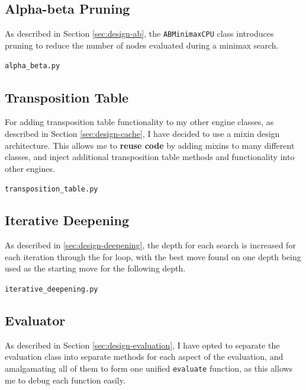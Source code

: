 \documentclass[../main/main.tex]{subfiles}
\begin{document}
\subsection{Alpha-beta Pruning}
\label{sec:alpha-beta}
As described in Section \ref{sec:design-ab}, the \lstinline{ABMinimaxCPU} class introduces pruning to reduce the number of nodes evaluated during a minimax search.

\noindent\verb|alpha_beta.py|


\subsection{Transposition Table}
\label{sec:transposition-table}
For adding transposition table functionality to my other engine classes, as described in Section \ref{sec:design-cache}, I have decided to use a mixin design architecture. This allows me to \textbf{reuse code} by adding mixins to many different classes, and inject additional transposition table methods and functionality into other engines.

\noindent\verb|transposition_table.py|


\subsection{Iterative Deepening}
\label{sec:iterative-deepening}
As described in \ref{sec:design-deepening}, the depth for each search is increased for each iteration through the for loop, with the best move found on one depth being used as the starting move for the following depth.

\noindent\verb|iterative_deepening.py|


\subsection{Evaluator}
As described in Section \ref{sec:design-evaluation}, I have opted to separate the evaluation class into separate methods for each aspect of the evaluation, and amalgamating all of them to form one unified \lstinline{evaluate} function, as this allows me to debug each function easily.
\end{document}
